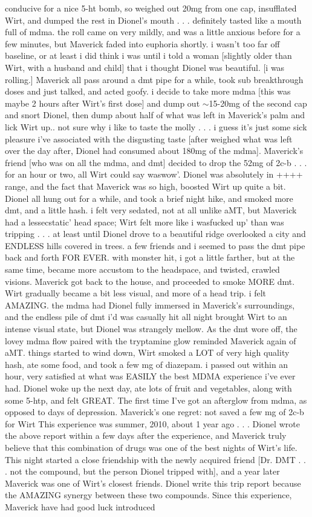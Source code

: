 \documentclass[12pt]{book}
\begin{document}
conducive for a nice 5-ht bomb, so weighed out 20mg from one cap, insufflated Wirt, and dumped the rest in Dionel's mouth . . .  definitely tasted like a mouth full of mdma. the roll came on very mildly, and was a little anxious before for a few minutes, but Maverick faded into euphoria shortly. i wasn't too far off baseline, or at least i did think i was until i told a woman [slightly older than Wirt, with a husband and child] that i thought Dionel was beautiful. [i was rolling.] Maverick all pass around a dmt pipe for a while, took sub breakthrough doses and just talked, and acted goofy. i decide to take more mdma [this was maybe 2 hours after Wirt's first dose] and dump out $\sim$15-20mg of the second cap and snort Dionel, then dump about half of what was left in Maverick's palm and lick Wirt up.. not sure why i like to taste the molly . . .  i guess it's just some sick pleasure i've associated with the disgusting taste [after weighed what was left over the day after, Dionel had consumed about 180mg of the mdma]. Maverick's friend [who was on all the mdma, and dmt] decided to drop the 52mg of 2c-b . . .  for an hour or two, all Wirt could say waswow'. Dionel was absolutely in ++++ range, and the fact that Maverick was so high, boosted Wirt up quite a bit. Dionel all hung out for a while, and took a brief night hike, and smoked more dmt, and a little hash. i felt very sedated, not at all unlike aMT, but Maverick had a lessecstatic' head space; Wirt felt more like i wasfucked up' than was tripping . . .  at least until Dionel drove to a beautiful ridge overlooked a city and ENDLESS hills covered in trees. a few friends and i seemed to pass the dmt pipe back and forth FOR EVER. with monster hit, i got a little farther, but at the same time, became more accustom to the headspace, and twisted, crawled visions. Maverick got back to the house, and proceeded to smoke MORE dmt. Wirt gradually became a bit less visual, and more of a head trip. i felt AMAZING. the mdma had Dionel fully immersed in Maverick's surroundings, and the endless pile of dmt i'd was casually hit all night brought Wirt to an intense visual state, but Dionel was strangely mellow. As the dmt wore off, the lovey mdma flow paired with the tryptamine glow reminded Maverick again of aMT. things started to wind down, Wirt smoked a LOT of very high quality hash, ate some food, and took a few mg of diazepam. i passed out within an hour, very satisfied at what was EASILY the best MDMA experience i've ever had. Dionel woke up the next day, ate lots of fruit and vegetables, along with some 5-htp, and felt GREAT. The first time I've got an afterglow from mdma, as opposed to days of depression. Maverick's one regret: not saved a few mg of 2c-b for Wirt This experience was summer, 2010, about 1 year ago . . .  Dionel wrote the above report within a few days after the experience, and Maverick truly believe that this combination of drugs was one of the best nights of Wirt's life. This night started a close friendship with the newly acquired friend [Dr. DMT . . .  not the compound, but the person Dionel tripped with], and a year later Maverick was one of Wirt's closest friends. Dionel write this trip report because the AMAZING synergy between these two compounds. Since this experience, Maverick have had good luck introduced 
\end{document}
